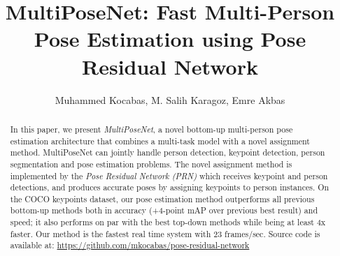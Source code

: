 \documentclass[runningheads]{llncs}
\begin{document}
\pagestyle{headings}
\mainmatter
\def\ECCV18SubNumber{757}  




\title{MultiPoseNet: Fast Multi-Person Pose Estimation using Pose Residual Network} 




\titlerunning{ }
\authorrunning{ }




\author{Muhammed Kocabas, M. Salih Karagoz, Emre Akbas}




\maketitle




\begin{abstract}
In this paper, we present \textit{MultiPoseNet}, a novel bottom-up multi-person pose estimation architecture that combines a multi-task model with a novel assignment method.  MultiPoseNet can jointly handle person detection, keypoint detection, person segmentation and pose estimation problems. The novel assignment method is implemented by the \textit{Pose Residual Network (PRN)} which receives keypoint and person detections, and produces accurate poses by assigning keypoints to person instances. On the COCO keypoints dataset, our pose estimation method outperforms all previous bottom-up methods both in accuracy (+4-point mAP over previous best result) and speed; it also performs on par with the best top-down methods while being at least 4x faster.  Our method is the fastest real time system with 23 frames/sec. Source code is available at: \url{https://github.com/mkocabas/pose-residual-network}





\end{abstract}
\end{document}
